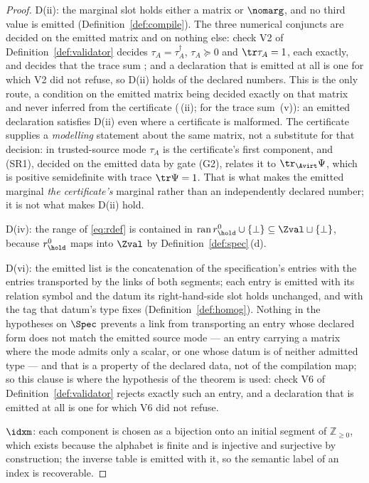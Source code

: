 \begin{proof}
D(ii): the marginal slot holds either a matrix or $\nomarg$, and no third value
is emitted (Definition~\ref{def:compile}). The three numerical conjuncts are
decided on the emitted matrix and on nothing else: check V2 of
Definition~\ref{def:validator} decides $\tau_A=\tau_A^{\dagger}$,
$\tau_A\succeq0$ and $\tr\tau_A=1$, each exactly, and decides that the trace
sum ; and a declaration that is emitted at all is one for
which V2 did not refuse, so D(ii) holds of the declared numbers. This is the
only route, a condition on the emitted matrix being decided exactly on that
matrix and never inferred from the certificate
(\,(ii); for the trace sum
\,(v)): an emitted declaration
satisfies D(ii) even where a certificate is malformed. The certificate
supplies a \emph{modelling} statement about the same matrix, not a substitute
for that decision: in trusted-source mode $\tau_A$ is the certificate's first
component, and (SR1), decided on the emitted data by gate (G2), relates it to
$\tr_{\Avirt}\Psi$, which is positive semidefinite with trace $\tr\Psi=1$.
That is what makes the emitted marginal \emph{the certificate's} marginal
rather than an independently declared number; it is not what makes D(ii)
hold.

D(iv): the range of \eqref{eq:rdef} is contained in
$\operatorname{ran}r^0_{\hold}\cup\{\perp\}\subseteq\Zval\sqcup\{\perp\}$,
because $r^0_{\hold}$ maps into $\Zval$ by
Definition~\ref{def:spec}\,(d).

D(vi): the emitted list is the concatenation of the specification's entries
with the entries transported by the links of both segments; each entry is
emitted with its relation symbol and the datum its right-hand-side slot holds
unchanged, and with the tag that datum's type fixes
(Definition~\ref{def:homog}). Nothing in the hypotheses on $\Spec$ prevents a
link from transporting an entry whose declared form does not match the
emitted source mode --- an entry carrying a matrix where the mode admits only
a scalar, or one whose datum is of neither admitted type --- and that is a
property of the declared data, not of the compilation map; so this clause is where the hypothesis of
the theorem is used: check V6 of Definition~\ref{def:validator} rejects
exactly such an entry, and a declaration that is emitted at all is one for
which V6 did not refuse.

$\idxm$: each component is chosen as a bijection onto an initial segment of
$\mathbb{Z}_{\ge0}$, which exists because the alphabet is finite and is
injective and surjective by construction; the inverse table is emitted with it,
so the semantic label of an index is recoverable.


\end{proof}
